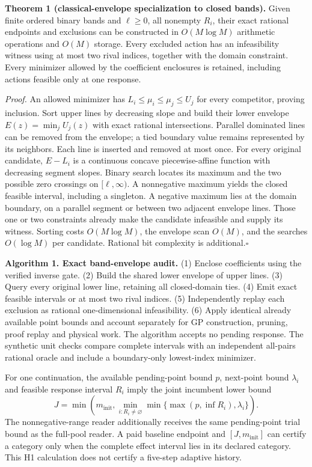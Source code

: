 \documentclass[]{interact}
\begin{document}
\textbf{Theorem 1 (classical-envelope specialization to closed bands).} Given finite ordered binary bands and $\ell\geq0$, all nonempty $R_i$, their exact rational endpoints and exclusions can be constructed in $O(M\log M)$ arithmetic operations and $O(M)$ storage. Every excluded action has an infeasibility witness using at most two rival indices, together with the domain constraint. Every minimizer allowed by the coefficient enclosures is retained, including actions feasible only at one response.

\textit{Proof.} An allowed minimizer has $L_i\leq\mu_i\leq\mu_j\leq U_j$ for every competitor, proving inclusion. Sort upper lines by decreasing slope and build their lower envelope $E(z)=\min_j U_j(z)$ with exact rational intersections. Parallel dominated lines can be removed from the envelope; a tied boundary value remains represented by its neighbors. Each line is inserted and removed at most once. For every original candidate, $E-L_i$ is a continuous concave piecewise-affine function with decreasing segment slopes. Binary search locates its maximum and the two possible zero crossings on $[\ell,\infty)$. A nonnegative maximum yields the closed feasible interval, including a singleton. A negative maximum lies at the domain boundary, on a parallel segment or between two adjacent envelope lines. Those one or two constraints already make the candidate infeasible and supply its witness. Sorting costs $O(M\log M)$, the envelope scan $O(M)$, and the searches $O(\log M)$ per candidate. Rational bit complexity is additional.\hfill$\square$

\textbf{Algorithm 1. Exact band-envelope audit.} (1) Enclose coefficients using the verified inverse gate. (2) Build the shared lower envelope of upper lines. (3) Query every original lower line, retaining all closed-domain ties. (4) Emit exact feasible intervals or at most two rival indices. (5) Independently replay each exclusion as rational one-dimensional infeasibility. (6) Apply identical already available point bounds and account separately for GP construction, pruning, proof replay and physical work. The algorithm accepts no pending response. The synthetic unit checks compare complete intervals with an independent all-pairs rational oracle and include a boundary-only lowest-index minimizer.

For one continuation, the available pending-point bound $p$, next-point bound $\lambda_i$ and feasible response interval $R_i$ imply the joint incumbent lower bound
\begin{equation}
J=\min\left(m_{\mathrm{init}},\min_{i:R_i\ne\varnothing}\min\{\max(p,\inf R_i),\lambda_i\}\right).\label{eq:joint_lower}
\end{equation}
The nonnegative-range reader additionally receives the same pending-point trial bound as the full-pool reader. A paid baseline endpoint and $[J,m_{\mathrm{init}}]$ can certify a category only when the complete effect interval lies in its declared category. This H1 calculation does not certify a five-step adaptive history.
\end{document}

